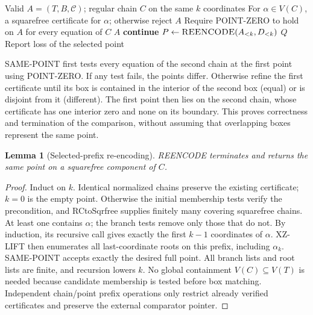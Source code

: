 \documentclass[11pt]{article}
\newtheorem{lemma}[theorem]{Lemma}
\theoremstyle{definition}
\newcommand{\alg}[1]{\textsc{#1}}
\begin{document}
\begin{algorithm}[H]
\caption{REENCODE: retain the selected point on another regular chain}\label{a:reencode}
\begin{algorithmic}[1]
\Require Valid $A=(T,B,\mathcal C)$; regular chain $C$ on the same $k$ coordinates
\Ensure For $\alpha\in V(C)$, a squarefree certificate for $\alpha$; otherwise reject
 \State \Return $A$ \EndIf
\State Require POINT-ZERO to hold on $A$ for every equation of $C$
 \State \Return $A$ \EndIf
\For{$D\in\alg{RCtoSqrfree}(C)$}
  \State \textbf{continue}
 \EndIf
 \State $P\gets\alg{REENCODE}(A_{<k},D_{<k})$
 \For{$Q\in\alg{LIFT-ONE}(D,P)$}
  \If{$\alg{SAME-POINT}(Q,A)$} \State \Return $Q$ \EndIf
 \EndFor
\EndFor
\State Report loss of the selected point
\end{algorithmic}
\end{algorithm}
SAME-POINT first tests every equation of the second chain at the first point
using POINT-ZERO. If any test fails, the points differ. Otherwise refine the
first certificate until its box is contained in the interior of the second box
(equal) or is disjoint from it (different). The first point then lies on the
second chain, whose certificate has one interior zero and none on its boundary.
This proves correctness and termination of the comparison, without assuming
that overlapping boxes represent the same point.

\begin{lemma}[Selected-prefix re-encoding]
REENCODE terminates and returns the same point on a squarefree component of $C$.
\end{lemma}
\begin{proof}
Induct on $k$. Identical normalized chains preserve the existing certificate;
$k=0$ is the empty point. Otherwise the initial membership tests verify the
precondition, and RCtoSqrfree supplies finitely many covering squarefree chains.
At least one contains $\alpha$; the branch tests remove only those that do not.
By induction, its recursive call gives exactly the first $k-1$ coordinates of
$\alpha$. XZ-LIFT then enumerates all last-coordinate roots on this prefix,
including $\alpha_k$. SAME-POINT accepts exactly the desired full point.
All branch lists and root lists are finite, and recursion lowers $k$.
No global containment $V(C)\subseteq V(T)$ is needed because candidate membership
is tested before box matching. Independent chain/point prefix operations only
restrict already verified certificates and preserve the external comparator pointer.
\end{proof}
\end{document}
